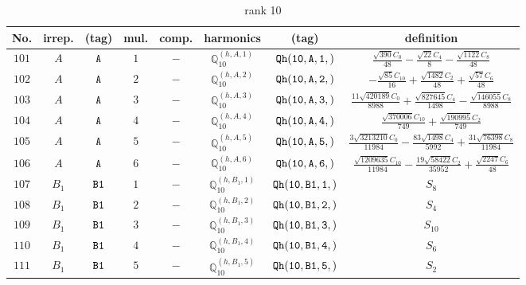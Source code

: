 \documentclass[fleqn,8pt]{jsarticle}
\begin{document}
\begin{table}[ht!]
\begin{center}
\caption{rank 10}
\renewcommand{\arraystretch}{1.3}
\begin{tabular}{cccccccc} \hline \hline
No. & irrep. & (tag) & mul. & comp. & harmonics & (tag) & definition \\ \hline
$ 101 $ & $ A $ & $ {\tt A} $ & $ 1 $ & $ - $ & $ \mathbb{Q}_{10}^{(h,A,1)} $ & $ {\tt Qh(10,A,1,)} $ & $ \frac{\sqrt{390} C_{0}}{48} - \frac{\sqrt{22} C_{4}}{8} - \frac{\sqrt{1122} C_{8}}{48} $ \\
$ 102 $ & $ A $ & $ {\tt A} $ & $ 2 $ & $ - $ & $ \mathbb{Q}_{10}^{(h,A,2)} $ & $ {\tt Qh(10,A,2,)} $ & $ - \frac{\sqrt{85} C_{10}}{16} + \frac{\sqrt{1482} C_{2}}{48} + \frac{\sqrt{57} C_{6}}{48} $ \\
$ 103 $ & $ A $ & $ {\tt A} $ & $ 3 $ & $ - $ & $ \mathbb{Q}_{10}^{(h,A,3)} $ & $ {\tt Qh(10,A,3,)} $ & $ \frac{11 \sqrt{420189} C_{0}}{8988} + \frac{\sqrt{827645} C_{4}}{1498} - \frac{\sqrt{146055} C_{8}}{8988} $ \\
$ 104 $ & $ A $ & $ {\tt A} $ & $ 4 $ & $ - $ & $ \mathbb{Q}_{10}^{(h,A,4)} $ & $ {\tt Qh(10,A,4,)} $ & $ \frac{\sqrt{370006} C_{10}}{749} + \frac{\sqrt{190995} C_{2}}{749} $ \\
$ 105 $ & $ A $ & $ {\tt A} $ & $ 5 $ & $ - $ & $ \mathbb{Q}_{10}^{(h,A,5)} $ & $ {\tt Qh(10,A,5,)} $ & $ \frac{3 \sqrt{3213210} C_{0}}{11984} - \frac{83 \sqrt{1498} C_{4}}{5992} + \frac{31 \sqrt{76398} C_{8}}{11984} $ \\
$ 106 $ & $ A $ & $ {\tt A} $ & $ 6 $ & $ - $ & $ \mathbb{Q}_{10}^{(h,A,6)} $ & $ {\tt Qh(10,A,6,)} $ & $ \frac{\sqrt{1209635} C_{10}}{11984} - \frac{19 \sqrt{58422} C_{2}}{35952} + \frac{\sqrt{2247} C_{6}}{48} $ \\
$ 107 $ & $ B_{1} $ & $ {\tt B1} $ & $ 1 $ & $ - $ & $ \mathbb{Q}_{10}^{(h,B_{1},1)} $ & $ {\tt Qh(10,B1,1,)} $ & $ S_{8} $ \\
$ 108 $ & $ B_{1} $ & $ {\tt B1} $ & $ 2 $ & $ - $ & $ \mathbb{Q}_{10}^{(h,B_{1},2)} $ & $ {\tt Qh(10,B1,2,)} $ & $ S_{4} $ \\
$ 109 $ & $ B_{1} $ & $ {\tt B1} $ & $ 3 $ & $ - $ & $ \mathbb{Q}_{10}^{(h,B_{1},3)} $ & $ {\tt Qh(10,B1,3,)} $ & $ S_{10} $ \\
$ 110 $ & $ B_{1} $ & $ {\tt B1} $ & $ 4 $ & $ - $ & $ \mathbb{Q}_{10}^{(h,B_{1},4)} $ & $ {\tt Qh(10,B1,4,)} $ & $ S_{6} $ \\
$ 111 $ & $ B_{1} $ & $ {\tt B1} $ & $ 5 $ & $ - $ & $ \mathbb{Q}_{10}^{(h,B_{1},5)} $ & $ {\tt Qh(10,B1,5,)} $ & $ S_{2} $ \\

\end{tabular}
\end{center}
\end{table}
\end{document}
